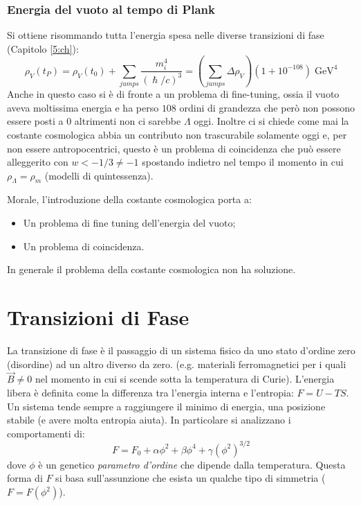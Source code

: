 \subsubsection{Energia del vuoto al tempo di Plank}
Si ottiene risommando tutta l'energia spesa nelle diverse transizioni di fase (Capitolo \ref{5:ch}):
$$
\rho_V (t_P) = \rho_V (t_0) + \sum_{jumps} \frac{m_i^4}{(\hslash / c)^3}= \left(\sum_{jumps}\Delta\rho_V \right) \left ( 1 + 10^{-108}\right)\; \mathrm{GeV^4}
$$
Anche in questo caso si è di fronte a un problema di fine-tuning, ossia il vuoto aveva moltissima energia e ha perso $108$ ordini di grandezza che però non possono essere posti a $0$ altrimenti non ci sarebbe $\Lambda$ oggi. Inoltre ci si chiede come mai la costante cosmologica abbia un contributo non trascurabile solamente oggi e, per non essere antropocentrici, questo è un problema di coincidenza che può essere alleggerito con $w<-1/3\neq -1$ spostando indietro nel tempo il momento in cui $\rho_\Lambda=\rho_m$ (modelli di quintessenza). 

\vspace{1em}
\noindent Morale, l'introduzione della costante cosmologica porta a:
\begin{itemize}
    \item Un problema di fine tuning dell'energia del vuoto;
    \item Un problema di coincidenza.
\end{itemize}
In generale il problema della costante cosmologica non ha soluzione.


\section{Transizioni di Fase}
La transizione di fase è il passaggio di un sistema fisico da uno stato d'ordine zero (disordine) ad un altro diverso da zero. (e.g. materiali ferromagnetici per i quali $\vec{B}\neq 0$ nel momento in cui si scende sotta la temperatura di Curie). L'energia libera è definita come la differenza tra l'energia interna e l'entropia: $F=U-TS$. Un sistema tende sempre a raggiungere il minimo di energia, una posizione stabile (e avere molta entropia aiuta). In particolare si analizzano i comportamenti di:
\begin{equation}
    F=F_0 +\alpha \phi^2 + \beta \phi^4 + \gamma (\phi^2)^{3/2}
\end{equation}
dove $\phi$ è un genetico \textit{parametro d'ordine} che dipende dalla temperatura. Questa forma di $F$ si basa sull'assunzione che esista un qualche tipo di simmetria ($F=F(\phi^2)$).


